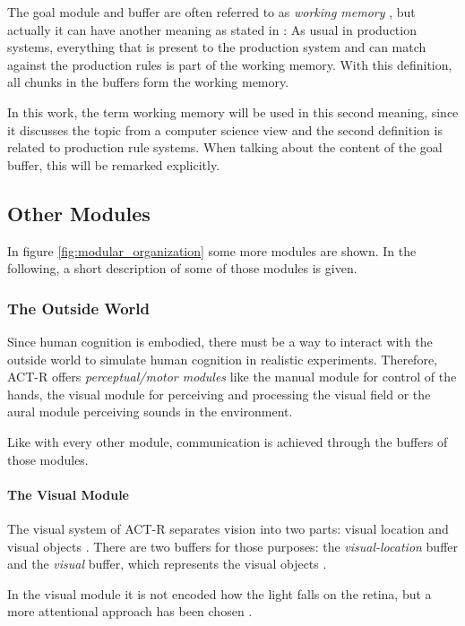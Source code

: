 The goal module and buffer are often referred to as \emph{working memory} \cite[p. 1041]{anderson_integrated_2004}, but actually it can have another meaning as stated in \cite{anderson_working_1996}: As usual in production systems, everything that is present to the production system and can match against the production rules is part of the working memory. With this definition, all chunks in the buffers form the working memory.

In this work, the term working memory will be used in this second meaning, since it discusses the topic from a computer science view and the second definition is related to production rule systems. When talking about the content of the goal buffer, this will be remarked explicitly.

\subsection{Other Modules}

In figure \ref{fig:modular_organization} some more modules are shown. In the following, a short description of some of those modules is given.

\subsubsection{The Outside World}

Since human cognition is embodied, there must be a way to interact with the outside world to simulate human cognition in realistic experiments. Therefore, ACT-R offers \emph{perceptual/motor modules} like the manual module for control of the hands, the visual module for perceiving and processing the visual field or the aural module perceiving sounds in the environment.

Like with every other module, communication is achieved through the buffers of those modules. 

\paragraph{The Visual Module} The visual system of ACT-R separates vision into two parts: visual location and visual objects \cite[p. 1039]{anderson_integrated_2004}. There are two buffers for those purposes: the \emph{visual-location} buffer and the \emph{visual} buffer, which represents the visual objects \cite[unit 2]{actr_tutorial}.

In the visual module it is not encoded how the light falls on the retina, but a more attentional approach has been chosen \cite[p. 1039]{anderson_integrated_2004}. 


